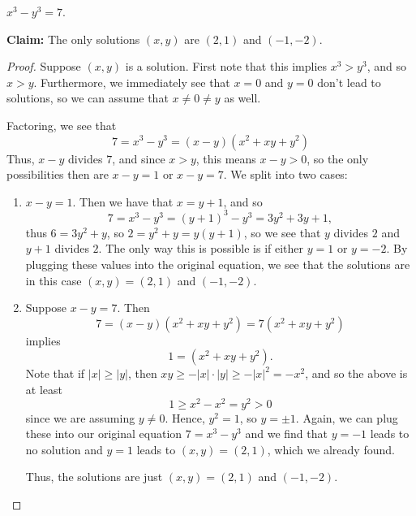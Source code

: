 \documentclass[11pt,dvipsnames]{book}
\numberwithin{figure}{section} %
\numberwithin{table}{section} %
\begin{document}
\begin{exercise}
 $x^3-y^3=7$.

\begin{solution}
{\bf Claim:} The only solutions $(x,y)$ are $(2,1)$ and $(-1,-2)$.

\begin{proof}
Suppose $(x,y)$ is a solution. First note that this implies $x^3>y^3$, and so $x>y$. Furthermore, we immediately see that $x=0$ and $y=0$ don't lead to solutions, so we can assume that $x\neq 0 \neq y$ as well.

Factoring, we see that
\[
7 = x^3-y^3= (x-y)(x^2+xy+y^2)
\]
Thus, $x-y$ divides $ 7$, and since $x>y$, this means $x-y>0$, so the only possibilities then are $x-y=1$ or $x-y=7$. We split into two cases:

\begin{enumerate}[label=(\alph*)]
\item $x-y=1$. Then we have that $x=y+1$, and so
\[
7=x^3-y^3= (y+1)^3-y^3 = 3y^2+3y+1,\]
thus $6=3y^2+y$, so $2=y^2+y=y(y+1)$, so we see that $y$ divides $2$ and $y+1$ divides $2$. The only way this is possible is if either $y=1$ or $y=-2$. By plugging these values into the original equation, we see that the solutions are in this case $(x,y)=(2,1)$ and $(-1,-2)$.
\item Suppose $x-y=7$. Then
\[
7=(x-y)(x^2+xy+y^2)=7(x^2+xy+y^2)
\]
implies
\[
1=(x^2+xy+y^2).
\]
Note that if $|x|\geq |y|$, then $xy\geq -|x|\cdot |y|\geq -|x|^2=-x^2$, and so the above is at least
\[
1\geq x^2-x^2=y^2>0\]
since we are assuming $y\neq 0$. Hence, $y^2=1$, so $y=\pm 1$. Again, we can plug these into our original equation $7=x^3-y^3$ and we find that $y=-1$ leads to no solution and $y=1$ leads to $(x,y)=(2,1)$, which we already found.

Thus, the solutions are just $(x,y)=(2,1)$ and $(-1,-2)$.
\end{enumerate}

\end{proof}

\end{solution}
\end{exercise}
\end{document}
